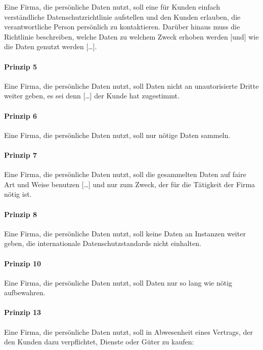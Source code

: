 Eine Firma, die persönliche Daten nutzt, soll eine für Kunden einfach verständliche Datenschutzrichtlinie aufstellen und den Kunden erlauben, die verantwortliche Person persönlich zu kontaktieren.
Darüber hinaus muss die Richtlinie beschreiben, welche Daten zu welchem Zweck erhoben werden [und] wie die Daten genutzt werden [\dots].

\paragraph*{Prinzip 5}

Eine Firma, die persönliche Daten nutzt, soll Daten nicht an unautorisierte Dritte weiter geben, es sei denn [\dots] der Kunde hat zugestimmt.

\paragraph*{Prinzip 6}

Eine Firma, die persönliche Daten nutzt, soll nur nötige Daten sammeln.

\paragraph*{Prinzip 7}

Eine Firma, die persönliche Daten nutzt, soll die gesammelten Daten auf faire Art und Weise benutzen [\dots] und nur zum Zweck, der für die Tätigkeit der Firma nötig ist.

\paragraph*{Prinzip 8}

Eine Firma, die persönliche Daten nutzt, soll keine Daten an Instanzen weiter geben, die internationale Datenschutzstandards nicht einhalten.

\paragraph*{Prinzip 10}

Eine Firma, die persönliche Daten nutzt, soll Daten nur so lang wie nötig aufbewahren.

\paragraph*{Prinzip 13}

Eine Firma, die persönliche Daten nutzt, soll in Abwesenheit eines Vertrags, der den Kunden dazu verpflichtet, Dienste oder Güter zu kaufen:

